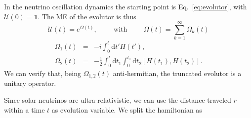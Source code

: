 \documentclass{article}
\newcommand{\de}[0]{\text{d}}
\begin{document}
In the neutrino oscillation dynamics the starting point is Eq.~\ref{eq:evolutor}, with ${\mathcal{U}(0) = \mathbb{1}}$. The ME of the evolutor is thus
\begin{equation}
	\mathcal{U}(t) = e^{\Omega(t)},\hspace{1cm} \text{with} \hspace{1cm} \Omega(t) = \sum_{k=1}^\infty \Omega_k (t)
\end{equation}
\begin{eqnarray}
	\Omega_1(t) &=& -i \int_0^t \de t' H(t'), \\
	\Omega_2(t) &=& -\frac{1}{2} \int_0^t \de t_1 \int_0^{t_1} \de t_2 \left[ H(t_1), H(t_2) \right].
\end{eqnarray}
We can verify that, being $\Omega_{1,2}(t)$ anti-hermitian, the truncated evolutor is a unitary operator.

Since solar neutrinos are ultra-relativistic, we can use the distance traveled $r$ within a time $t$ as evolution variable. We split the hamiltonian as




\end{document}
